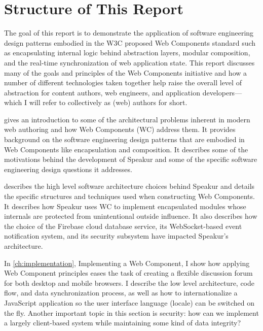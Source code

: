 \section{Structure of This Report}
%

The goal of this report is to demonstrate the application of 
software engineering 
design patterns embodied in the W3C proposed Web Components standard such as 
encapsulating internal logic 
behind abstraction layers, 
modular composition, 
and the real-time synchronization of web application state. 
This report discusses many of the goals and principles of the Web Components initiative and how a number of different technologies taken together help raise the overall level of 
abstraction for content authors, web engineers, and application developers---which I will refer to collectively as (web) authors for short.

 gives an introduction to some of the architectural problems inherent in modern web authoring and how Web Components (WC) address them. 
It provides background on the software engineering design patterns that are embodied in Web Components like encapsulation and composition.
It describes some of the motivations behind the development of Speakur and some of the specific software engineering design questions it addresses.

 describes the high level software architecture choices behind Speakur and details the specific structures and techniques used when constructing Web Components.
It describes how Speakur uses WC to implement encapsulated modules whose internals are protected from unintentional outside influence. 
It also describes how the choice of the Firebase cloud database service, its WebSocket-based event notification system, and its security subsystem have impacted Speakur's architecture.

In \cref{ch:implementation}, Implementing a Web Component, I show how applying Web Component principles eases the task of creating a flexible discussion forum for both desktop and mobile browsers. 
I describe the low level architecture, code flow, and data synchronization process, 
as well as how to internationalize a JavaScript application so the user interface language (locale) can be switched on the fly.
Another important topic in this section is security: how can we implement a largely client-based system while maintaining some kind of data integrity?

